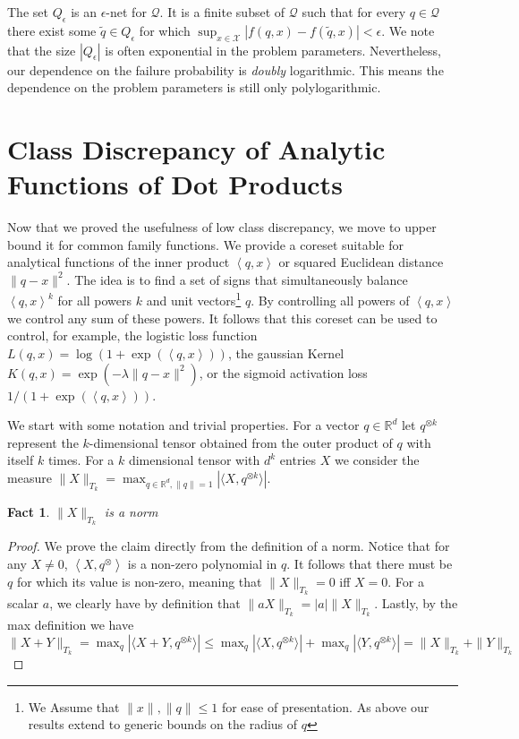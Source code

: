 \documentclass[anon,12pt]{colt2019} %
\newtheorem{fact}[theorem]{Fact}
\newcommand{\ip}[1]{\left \langle #1 \right \rangle}
\newcommand{\R}{\mathbb{R}}
\newcommand{\eps}{\epsilon}
\newcommand{\X}{\mathcal{X}}
\newcommand{\Q}{\mathcal{Q}}
\begin{document}
{The set $Q_\eps$ is an $\eps$-net for $\Q$. 
It is a finite subset of $\Q$ such that for every $q \in \Q$ there exist some $\tilde{q} \in Q_\eps$ for which $\sup_{x \in \X} |f(q,x) - f(\tilde{q},x)| < \eps$. 
We note that the size $|Q_\eps|$ is often exponential in the problem parameters. 
Nevertheless, our dependence on the failure probability is \emph{doubly} logarithmic. 
This means the dependence on the problem parameters is still only polylogarithmic.

\section{Class Discrepancy of Analytic Functions of Dot Products} \label{sec:analytic}

Now that we proved the usefulness of low class discrepancy, we move to upper bound it for common family functions. We provide a coreset suitable for analytical functions of the inner product $\ip{q,x}$ or squared Euclidean distance $\|q-x\|^2$. 
%
The idea is to find a set of signs that simultaneously balance $\ip{q,x}^k$ for all powers $k$ and unit vectors\footnote{We Assume that $\|x\|,\|q\| \leq 1$ for ease of presentation. As above our results extend to generic bounds on the radius of $q$} $q$. By controlling all powers of $\ip{q,x}$ we control any sum of these powers. It follows that this coreset can be used to control, for example, the logistic loss function $L(q,x) = \log(1+\exp(\ip{q,x}))$, the gaussian Kernel $K(q,x) = \exp(-\lambda \|q-x\|^2)$, or the sigmoid activation loss $1/(1 + \exp(\ip{q,x}))$.

We start with some notation and trivial properties. 
For a vector $q \in \R^d$ let $q^{\otimes k}$ represent the $k$-dimensional tensor obtained from the outer product of $q$ with itself $k$ times. For a $k$ dimensional tensor with $d^k$ entries $X$ we consider the measure
$\|X\|_{T_k} = \max_{q \in \R^d, \|q\|=1} \left| \langle X, q^{\otimes k}\rangle \right|$.
\begin{fact}
$\|X\|_{T_k}$ is a norm
\end{fact}
\begin{proof}
We prove the claim directly from the definition of a norm.
Notice that for any $X \neq 0$, $\ip{X, q^{\otimes}}$ is a non-zero polynomial in $q$. It follows that there must be $q$ for which its value is non-zero, meaning that $\|X\|_{T_k}=0$ iff $X=0$. For a scalar $a$, we clearly have by definition that
$\|aX\|_{T_k} = |a|\|X\|_{T_k}$.  Lastly, by the max definition we  have
$ \|X+Y\|_{T_k} =  \max_q \left| \langle X+Y, q^{\otimes k}\rangle \right| \leq 
\max_q \left| \langle X, q^{\otimes k}\rangle \right| + \max_q\left| \langle Y, q^{\otimes k}\rangle \right| = \|X\|_{T_k} + \|Y\|_{T_k}$
\end{proof}

}
\end{document}
